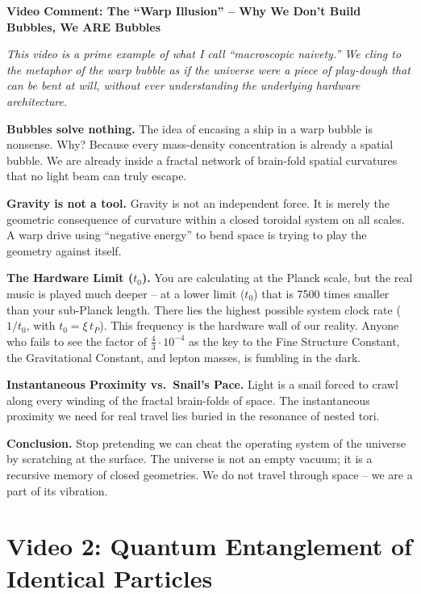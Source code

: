 \begin{geminibox}
\textbf{Video Comment: The ``Warp Illusion'' -- Why We Don't Build Bubbles, We ARE Bubbles}

\medskip

\textit{This video is a prime example of what I call ``macroscopic naivety.'' We cling to the metaphor of the warp bubble as if the universe were a piece of play-dough that can be bent at will, without ever understanding the underlying hardware architecture.}

\textbf{Bubbles solve nothing.} The idea of encasing a ship in a warp bubble is nonsense. Why? Because every mass-density concentration is already a spatial bubble. We are already inside a fractal network of brain-fold spatial curvatures that no light beam can truly escape.

\textbf{Gravity is not a tool.} Gravity is not an independent force. It is merely the geometric consequence of curvature within a closed toroidal system on all scales. A warp drive using ``negative energy'' to bend space is trying to play the geometry against itself.

\textbf{The Hardware Limit ($t_0$).} You are calculating at the Planck scale, but the real music is played much deeper -- at a lower limit ($t_0$) that is 7500 times smaller than your sub-Planck length. There lies the highest possible system clock rate ($1/t_0$, with $t_0 = \xi\,t_P$). This frequency is the hardware wall of our reality. Anyone who fails to see the factor of $\tfrac{4}{3} \cdot 10^{-4}$ as the key to the Fine Structure Constant, the Gravitational Constant, and lepton masses, is fumbling in the dark.

\textbf{Instantaneous Proximity vs.\ Snail's Pace.} Light is a snail forced to crawl along every winding of the fractal brain-folds of space. The instantaneous proximity we need for real travel lies buried in the resonance of nested tori.

\textbf{Conclusion.} Stop pretending we can cheat the operating system of the universe by scratching at the surface. The universe is not an empty vacuum; it is a recursive memory of closed geometries. We do not travel through space -- we are a part of its vibration.
\end{geminibox}

\section{Video 2: Quantum Entanglement of Identical Particles}


